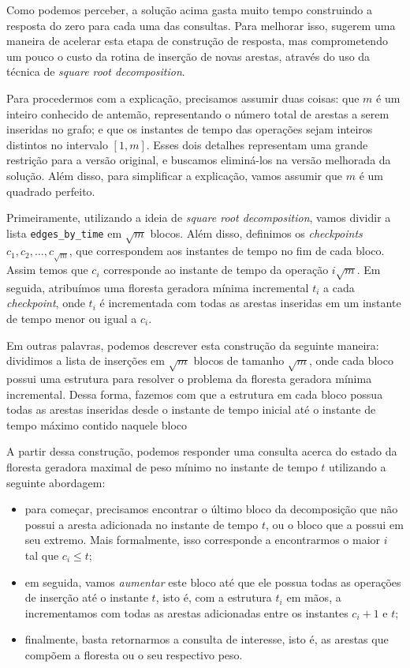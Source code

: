 Como podemos perceber, a solução acima gasta muito tempo construindo a resposta do zero para cada uma das consultas. Para melhorar isso, \citet{10.1093/comjnl/bxaa135} sugerem uma maneira de acelerar esta etapa de construção de resposta, mas comprometendo um pouco o custo da rotina de inserção de novas arestas, através do uso da técnica de \emph{square root decomposition}.

Para procedermos com a explicação, precisamos assumir duas coisas: que $m$ é um inteiro conhecido de antemão, representando o número total de arestas a serem inseridas no grafo; e que os instantes de tempo das operações sejam inteiros distintos no intervalo $[1,m]$. Esses dois detalhes representam uma grande restrição para a versão original, e buscamos eliminá-los na versão melhorada da solução. Além disso, para simplificar a explicação, vamos assumir que $m$ é um quadrado perfeito.

Primeiramente, utilizando a ideia de \emph{square root decomposition}, vamos dividir a lista \texttt{edges\_by\_time} em $\sqrt{m}$ blocos. Além disso, definimos os \emph{checkpoints} $c_1, c_2, \dots, c_{\sqrt{m}}$, que correspondem aos instantes de tempo no fim de cada bloco. Assim temos que $c_i$ corresponde ao instante de tempo da operação $i \sqrt{m}$. Em seguida, atribuímos uma floresta geradora mínima incremental $t_i$ a cada \emph{checkpoint}, onde $t_i$ é incrementada com todas as arestas inseridas em um instante de tempo menor ou igual a $c_i$.

Em outras palavras, podemos descrever esta construção da seguinte maneira: dividimos a lista de inserções em $\sqrt{m}$ blocos de tamanho $\sqrt{m}$, onde cada bloco possui uma estrutura para resolver o problema da floresta geradora mínima incremental. Dessa forma, fazemos com que a estrutura em cada bloco possua todas as arestas inseridas desde o instante de tempo inicial até o instante de tempo máximo contido naquele bloco

A partir dessa construção, podemos responder uma consulta acerca do estado da floresta geradora maximal de peso mínimo no instante de tempo $t$ utilizando a seguinte abordagem:

\begin{itemize}
    \item para começar, precisamos encontrar o último bloco da decomposição que não possui a aresta adicionada no instante de tempo $t$, ou o bloco que a possui em seu extremo. Mais formalmente, isso corresponde a encontrarmos o maior $i$ tal que $c_i \leq t$;
    \item em seguida, vamos \emph{aumentar} este bloco até que ele possua todas as operações de inserção até o instante $t$, isto é, com a estrutura $t_i$ em mãos, a incrementamos com todas as arestas adicionadas entre os instantes $c_i + 1$ e $t$;
    \item finalmente, basta retornarmos a consulta de interesse, isto é, as arestas que compõem a floresta ou o seu respectivo peso.
\end{itemize}

